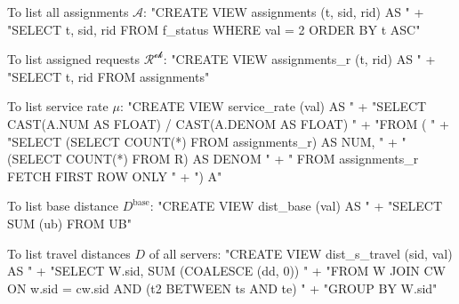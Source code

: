 \documentclass{article}
\def\nwendcode{\endtrivlist \endgroup}
\let\nwdocspar=\par
\theoremstyle{definition}
\begin{document}
To list all assignments $\mathcal{A}$:
\nwenddocs{}\endmoddef{}
"CREATE VIEW assignments (t, sid, rid) AS "
  + "SELECT t, sid, rid FROM f_status WHERE val = 2 ORDER BY t ASC"
\nwendcode{}\nwdocspar
To list assigned requests $\mathcal{R^\textrm{ok}}$:
\nwenddocs{}\endmoddef{}
"CREATE VIEW assignments_r (t, rid) AS "
  + "SELECT t, rid FROM assignments"
\nwendcode{}\nwdocspar
To list service rate $\mu$:
\nwenddocs{}\endmoddef{}
"CREATE VIEW service_rate (val) AS "
  + "SELECT CAST(A.NUM AS FLOAT) / CAST(A.DENOM AS FLOAT) "
  + "FROM ( "
  + "SELECT (SELECT COUNT(*) FROM assignments_r) AS NUM, "
  + "       (SELECT COUNT(*) FROM R) AS DENOM "
  + "       FROM assignments_r FETCH FIRST ROW ONLY "
  + ") A"
\nwendcode{}\nwdocspar
To list base distance $D^\textrm{base}$:
\nwenddocs{}\endmoddef{}
"CREATE VIEW dist_base (val) AS "
  + "SELECT SUM (ub) FROM UB"
\nwendcode{}\nwdocspar
To list travel distances $D$ of all servers:
\nwenddocs{}\endmoddef{}
"CREATE VIEW dist_s_travel (sid, val) AS "
  + "SELECT W.sid, SUM (COALESCE (dd, 0)) "
  + "FROM W JOIN CW ON w.sid = cw.sid AND (t2 BETWEEN ts AND te) "
  + "GROUP BY W.sid"
\end{document}
